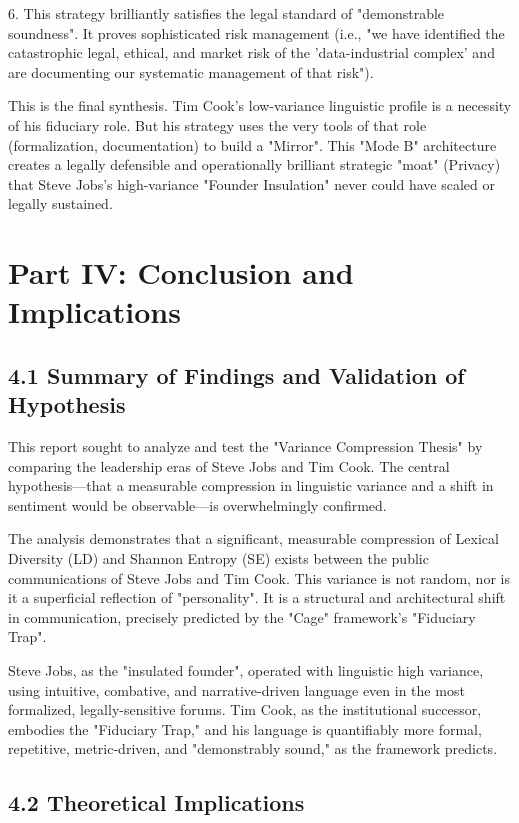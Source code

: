 \documentclass[12pt]{article}
\begin{document}
6. This strategy brilliantly satisfies the legal standard of "demonstrable soundness". It proves sophisticated risk management (i.e., "we have identified the catastrophic legal, ethical, and market risk of the 'data-industrial complex' and are documenting our systematic management of that risk").

This is the final synthesis. Tim Cook's low-variance linguistic profile is a necessity of his fiduciary role. But his strategy uses the very tools of that role (formalization, documentation) to build a "Mirror". This "Mode B" architecture creates a legally defensible and operationally brilliant strategic "moat" (Privacy) that Steve Jobs's high-variance "Founder Insulation" never could have scaled or legally sustained.

\section{Part IV: Conclusion and Implications}

\subsection{4.1 Summary of Findings and Validation of Hypothesis}

This report sought to analyze and test the "Variance Compression Thesis" by comparing the leadership eras of Steve Jobs and Tim Cook. The central hypothesis—that a measurable compression in linguistic variance and a shift in sentiment would be observable—is overwhelmingly confirmed.

The analysis demonstrates that a significant, measurable compression of Lexical Diversity (LD) and Shannon Entropy (SE) exists between the public communications of Steve Jobs and Tim Cook. This variance is not random, nor is it a superficial reflection of "personality". It is a structural and architectural shift in communication, precisely predicted by the "Cage" framework's "Fiduciary Trap".

Steve Jobs, as the "insulated founder", operated with linguistic high variance, using intuitive, combative, and narrative-driven language even in the most formalized, legally-sensitive forums. Tim Cook, as the institutional successor, embodies the "Fiduciary Trap," and his language is quantifiably more formal, repetitive, metric-driven, and "demonstrably sound," as the framework predicts.

\subsection{4.2 Theoretical Implications}
\end{document}

